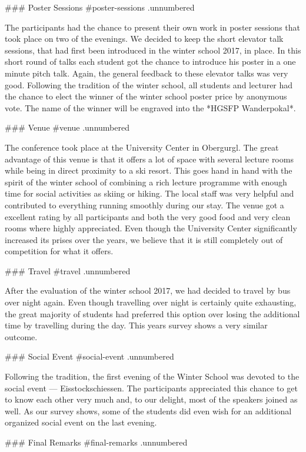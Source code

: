 ### Poster Sessions {#poster-sessions .unnumbered}

The participants had the chance to present their own work in poster
sessions that took place on two of the evenings. We decided to keep
the short elevator talk sessions, that had first been introduced in the
winter school 2017, in place. In this short round of talks each student
got the chance to introduce his poster in a one minute pitch talk.
Again, the general feedback to these elevator talks was very good.
Following the tradition of the winter school, all students and lecturer
had the chance to elect the winner of the winter school poster price by
anonymous vote. The name of the winner will be engraved into the *HGSFP
Wanderpokal*.

### Venue {#venue .unnumbered}

The conference took place at the University Center in Obergurgl. The
great advantage of this venue is that it offers a lot of space with
several lecture rooms while being in direct proximity to a ski resort.
This goes hand in hand with the spirit of the winter school of combining
a rich lecture programme with enough time for social activities as
skiing or hiking. The local staff was very helpful and contributed to
everything running smoothly during our stay. The venue got a excellent
rating by all participants and both the very good food and very clean
rooms where highly appreciated. Even though the University Center
significantly increased its prises over the years, we believe that it is
still completely out of competition for what it offers.

### Travel {#travel .unnumbered}

After the evaluation of the winter school 2017, we had decided to travel
by bus over night again. Even though travelling over night is
certainly quite exhausting, the great majority of students had preferred
this option over losing the additional time by travelling during the
day. This years survey shows a very similar outcome.

### Social Event {#social-event .unnumbered}

Following the tradition, the first evening of the Winter School was
devoted to the social event — Eisstockschiessen. The participants
appreciated this chance to get to know each other very
much and, to our delight, most of the speakers joined as well. As our
survey shows, some of the students did even wish for an additional
organized social event on the last evening.

### Final Remarks {#final-remarks .unnumbered}

